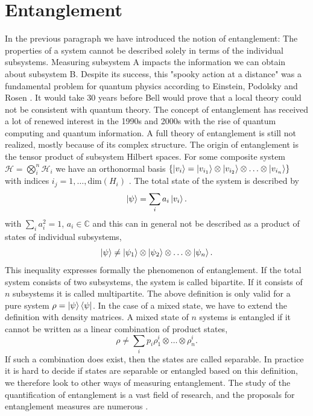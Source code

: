 \section{Entanglement}\label{sec:entanglement}

In the previous paragraph we have introduced the notion of entanglement: The properties of a system cannot be described solely in terms of the individual subsystems. Measuring subsystem A impacts the information we can obtain about subsystem B. Despite its success, this "spooky action at a distance" was a fundamental problem for quantum physics according to Einstein, Podolsky and Rosen \cite{EPR}. It would take 30 years before Bell would prove that a local theory could not be consistent with quantum theory. The concept of entanglement has received a lot of renewed interest in the 1990s and 2000s with the rise of quantum computing and quantum information. A full theory of entanglement is still not realized, mostly because of its complex structure. \newline
The origin of entanglement is the tensor product of subsystem Hilbert spaces. For some composite system $\mathcal{H} = \bigotimes_i^n \mathcal{H}_i$ we have an orthonormal basis $\{\ket{v_i} = \ket{v_{i_1}} \otimes \ket{v_{i_2}} \otimes \ldots \otimes \ket{v_{i_n}}\}$ with indices $i_j=1,\ldots ,\text{dim}(H_i)$ . The total state of the system is described by
\begin{equation*}
    \ket{\psi} = \sum_i a_i \ket{v_i}.
\end{equation*}
with $\sum_i a_i^2 = 1$, $a_i \in \mathbb{C}$ and this can in general not be described as a product of states of individual subsystems,
\begin{equation*}
    \ket{\psi} \neq \ket{\psi_1}\otimes \ket{\psi_2} \otimes \ldots \otimes \ket{\psi_n}.
\end{equation*}
This inequality expresses formally the phenomenon of entanglement. If the total system consists of two subsystems, the system is called bipartite. If it consists of $n$ subsystems it is called multipartite. The above definition is only valid for a pure system $\rho = \ket{\psi}\bra{\psi}$. In the case of a mixed state, we have to extend the definition with density matrices. A mixed state of $n$ systems is entangled if it cannot be written as a linear combination of product states,
\begin{equation}
    \rho \neq \sum_i p_i \rho_1^i \otimes \ldots \otimes \rho^i_n
    \label{eq:entangled}.
\end{equation}
If such a combination does exist, then the states are called separable. In practice it is hard to decide if states are separable or entangled based on this definition, we therefore look to other ways of measuring entanglement. The study of the quantification of entanglement is a vast field of research, and the proposals for entanglement measures are numerous \cite{Horodecki2009}.\newline
